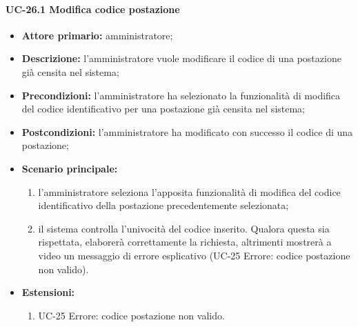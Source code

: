 \paragraph{UC-26.1 Modifica codice postazione}
  \begin{itemize}
	\item \textbf{Attore primario:} amministratore;
	\item \textbf{Descrizione:} l'amministratore vuole modificare il codice di una postazione già censita nel sistema;
	\item \textbf{Precondizioni:} l'amministratore ha selezionato la funzionalità di modifica del codice identificativo per una postazione già censita nel sistema;
	\item \textbf{Postcondizioni:} l'amministratore ha modificato con successo il codice di una postazione;
	\item \textbf{Scenario principale:}
	      \begin{enumerate}
		      \item l'amministratore seleziona l'apposita funzionalità di modifica del codice identificativo della postazione precedentemente selezionata;
		      \item il sistema controlla l'univocità del codice inserito. Qualora questa sia rispettata, elaborerà correttamente la richiesta, altrimenti mostrerà a video un messaggio di errore esplicativo (UC-25 Errore: codice postazione non valido).
	      \end{enumerate}
	\item \textbf{Estensioni:}
		\begin{enumerate}
		      \item UC-25 Errore: codice postazione non valido.
	      \end{enumerate}
\end{itemize}

    
